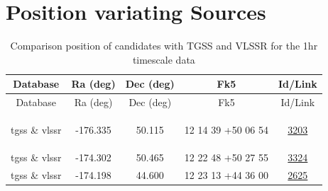 \documentclass{article}
\begin{document}
\section{Position variating Sources}\label{possection:KmeulenTrap4P23:1hr}

\begin{longtable}{c|c|c|c|c} 
\toprule 
Database & Ra (deg) & Dec (deg)& Fk5 & Id/Link \\\midrule 
\endfirsthead 
\toprule 
Database & Ra (deg) & Dec (deg) & Fk5 &Id/Link  \\\midrule 
\endhead 
\bottomrule 
\endfoot 
\bottomrule
\caption{ Comparison position of candidates with TGSS and VLSSR for the 1hr timescale data} 
\endlastfoot
\label{KmeulenTrap4P23:1hr:tablepos}

tgss \& vlssr & -176.335 & 50.115 & 12 14 39 +50 06 54 &  \href{http://banana.transientskp.org/r4/vlo_KmeulenTrap4P23/runningcatalog/3203}{3203} \\
tgss \& vlssr & -174.302 & 50.465 & 12 22 48 +50 27 55 &  \href{http://banana.transientskp.org/r4/vlo_KmeulenTrap4P23/runningcatalog/3324}{3324} \\
tgss \& vlssr & -174.198 & 44.600 & 12 23 13 +44 36 00 &  \href{http://banana.transientskp.org/r4/vlo_KmeulenTrap4P23/runningcatalog/2625}{2625} \\
\end{longtable}
\end{document}
